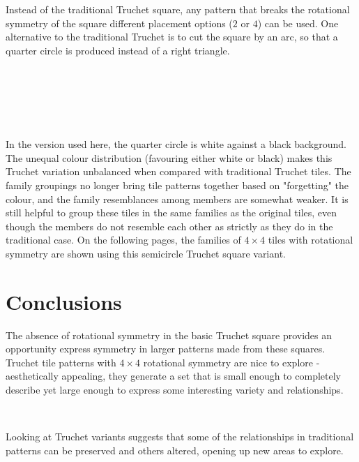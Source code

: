 \documentclass{tufte-book}
\begin{document}
\noindent
Instead of the traditional Truchet square, any pattern that breaks the rotational symmetry of the square different placement options ($2$ or $4$) can be used. One alternative to the traditional Truchet is to cut the square by an arc, so that a quarter circle is produced instead of a right triangle. 

\,
\vspace{0.2cm}

{
\setlength{\tabcolsep}{3pt}
\renewcommand{\arraystretch}{2}

}

\,
\vspace{0.2cm}
{
\setlength{\tabcolsep}{0pt}
\renewcommand{\arraystretch}{0}

}

\,
\vspace{0.2cm}

\noindent
In the version used here, the quarter circle is  white against a black background. The unequal colour distribution (favouring either white or black) makes this Truchet variation unbalanced when compared with traditional Truchet tiles. The family groupings no longer bring tile patterns together based on "forgetting" the colour, and the family resemblances among members are somewhat weaker. It is still helpful to group these tiles in the same families as the original tiles, even though the members do not resemble each other as strictly as they do in the traditional case. On the following pages, the families of $4\times4$  tiles with rotational symmetry are shown using this semicircle Truchet square variant.

\newpage



\chapter{Conclusions}

\noindent
The absence of rotational symmetry in the basic Truchet square provides an opportunity express symmetry in larger patterns made from these squares. Truchet tile patterns with $4\times 4$ rotational symmetry are nice to explore - aesthetically appealing, they generate a set that is small enough to completely describe yet large enough to express some interesting variety and relationships.

\,
\vspace{0.4cm}

\noindent
Looking at Truchet variants suggests that some of the relationships in traditional patterns can be preserved and others altered, opening up new areas to explore.

\backmatter
\nocite{*}


\end{document}
